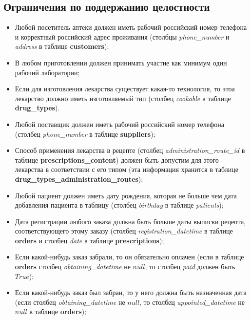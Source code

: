 \documentclass[a4paper]{article}
\newcommand{\dbtable}[1]{\textbf{#1}}
\newcommand{\dbtableref}[1]{\textit{#1}}
\begin{document}
		\subsection{Ограничения по поддержанию целостности}
			\begin{itemize}
				\item Любой посетитель аптеки должен иметь рабочий российский номер телефона и корректный российский адрес проживания (столбцы \dbtableref{phone\_number} и \dbtableref{address} в таблице \dbtable{customers}); 
				
				\item В любом приготовлении должен принимать участие как минимум один рабочий лаборатории;
			
				\item Если для изготовления лекарства существует какая-то технология, то этоа лекарство должно иметь изготовляемый тип (столбец \dbtableref{cookable} в таблице \dbtable{drug\_types}).
				
				\item Любой поставщик должен иметь рабочий российский номер телефона \newline (столбец \dbtableref{phone\_number} в таблице \dbtable{suppliers});
				
				\item Способ применения лекарства в рецепте (столбец \dbtableref{administration\_route\_id} в таблице \dbtable{prescriptions\_content}) должен быть допустим для этого лекарства в соответствии с его типом (эта информация хранится в таблице \dbtable{drug\_types\_administration\_routes});
				
				\item Любой пациент должен иметь дату рождения, которая не больше чем дата добавления пациента в таблицу (столбец \dbtableref{birthday} в таблице \dbtableref{patients});
				
				\item Дата регистрации любого заказа должна быть больше даты выписки рецепта, соответствующего этому заказу (столбец \dbtableref{registration\_datetime} в таблице \dbtable{orders} и столбец \dbtableref{date} в таблице \dbtable{prescriptions});
				
				\item Если какой-нибудь заказ забрали, то он обязательно оплачен (если в таблице \dbtable{orders} столбец \dbtableref{obtaining\_datetime} не $null$, то столбец \dbtableref{paid} должен быть $True$);
				
				\item Если какой-нибудь заказ был забран, то у него должна быть назначенная дата (если столбец \dbtableref{obtaining\_datetime} не $null$, то столбец \dbtableref{appointed\_datetime} не $null$ в таблице \dbtable{orders});
				

\end{itemize}
\end{document}
